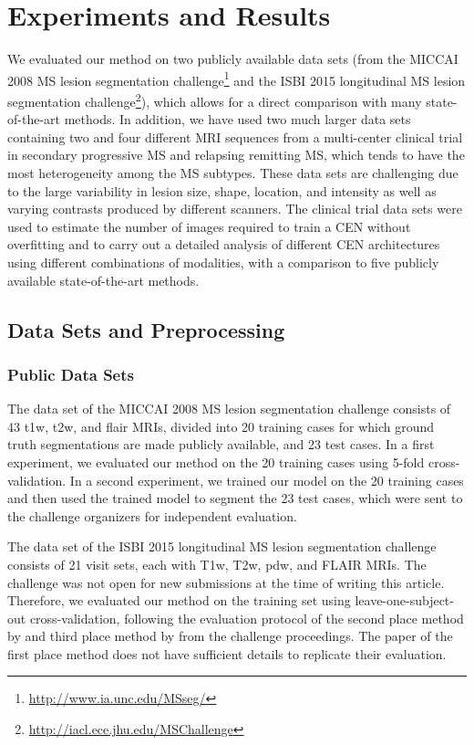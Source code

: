 
\section[Experiments and results]{Experiments and Results}

We evaluated our method on two publicly available data sets (from the MICCAI
2008 MS lesion segmentation
challenge\footnote{\url{http://www.ia.unc.edu/MSseg/}} and the ISBI 2015
longitudinal MS lesion segmentation
challenge\footnote{\url{http://iacl.ece.jhu.edu/MSChallenge}}), which allows for
a direct comparison with many state-of-the-art methods. In addition, we have
used two much larger data sets containing two and four different MRI sequences
from a multi-center clinical trial in secondary progressive MS and relapsing
remitting MS, which tends to have the most heterogeneity among the MS subtypes.
These data sets are challenging due to the large variability in lesion size,
shape, location, and intensity as well as varying contrasts produced by
different scanners. The clinical trial data sets were used to estimate the
number of images required to train a CEN without overfitting and to carry out a
detailed analysis of different CEN architectures using different combinations of
modalities, with a comparison to five publicly available state-of-the-art
methods.

\subsection[Data sets and preprocessing]{Data Sets and Preprocessing}

\subsubsection{Public Data Sets}
The data set of the MICCAI 2008 MS lesion segmentation challenge
\citep{styner20083d} consists of 43 \gls{t1w}, \gls{t2w}, and
\gls{flair} MRIs, divided into 20 training cases for which ground truth
segmentations are made publicly available, and 23 test cases. In a first
experiment, we evaluated our method on the 20 training cases using 5-fold
cross-validation. In a second experiment, we trained our model on the 20
training cases and then used the trained model to segment the 23 test cases,
which were sent to the challenge organizers for independent evaluation.

The data set of the ISBI 2015 longitudinal MS lesion segmentation challenge
consists of 21 visit sets, each with T1w, T2w, \gls{pdw}, and FLAIR MRIs. The
challenge was not open for new submissions at the time of writing this article.
Therefore, we evaluated our method on the training set using
leave-one-subject-out cross-validation, following the evaluation protocol of the
second place method by \citet{jesson2015} and third place method by
\citet{maier2015} from the challenge proceedings. The paper of the first place
method does not have sufficient details to replicate their evaluation.


